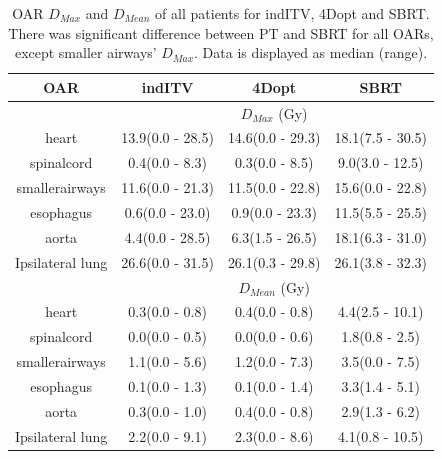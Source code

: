\begin{table}[H]
	\centering
	\caption{OAR $D_{Max}$ and $D_{Mean}$ of all patients for indITV, 4Dopt and SBRT. There was significant difference between PT and SBRT for all OARs, except
	smaller airways' $D_{Max}$. Data is displayed as median (range).}
	\begin{tabular}{c|c|c|c}
		\hline\hline
		 
		OAR &  indITV & 4Dopt & SBRT \\
		\hline
		& \multicolumn{3}{c}{$D_{Max}$ (Gy)}  \\
		\hline
heart & 13.9(0.0 - 28.5) & 14.6(0.0 - 29.3) & 18.1(7.5 - 30.5)\\ 
spinalcord & 0.4(0.0 - 8.3) & 0.3(0.0 - 8.5) & 9.0(3.0 - 12.5)\\ 
smallerairways & 11.6(0.0 - 21.3) & 11.5(0.0 - 22.8) & 15.6(0.0 - 22.8)\\ 
esophagus & 0.6(0.0 - 23.0) & 0.9(0.0 - 23.3) & 11.5(5.5 - 25.5)\\ 
aorta & 4.4(0.0 - 28.5) & 6.3(1.5 - 26.5) & 18.1(6.3 - 31.0)\\ 
Ipsilateral lung & 26.6(0.0 - 31.5) & 26.1(0.3 - 29.8) & 26.1(3.8 - 32.3)\\ 

\hline\hline
& \multicolumn{3}{c}{$D_{Mean}$ (Gy)} \\
\hline

heart & 0.3(0.0 - 0.8) & 0.4(0.0 - 0.8) & 4.4(2.5 - 10.1)\\ 
spinalcord & 0.0(0.0 - 0.5) & 0.0(0.0 - 0.6) & 1.8(0.8 - 2.5)\\ 
smallerairways & 1.1(0.0 - 5.6) & 1.2(0.0 - 7.3) & 3.5(0.0 - 7.5)\\ 
esophagus & 0.1(0.0 - 1.3) & 0.1(0.0 - 1.4) & 3.3(1.4 - 5.1)\\ 
aorta & 0.3(0.0 - 1.0) & 0.4(0.0 - 0.8) & 2.9(1.3 - 6.2)\\ 
Ipsilateral lung & 2.2(0.0 - 9.1) & 2.3(0.0 - 8.6) & 4.1(0.8 - 10.5)\\ 
\hline\hline
	\end{tabular}
	\label{tab:OARComplex}
\end{table}

